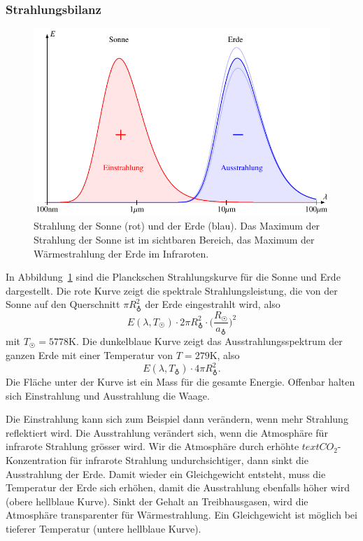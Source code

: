 \subsubsection{Strahlungsbilanz}
\begin{figure}
\centering
\includegraphics{chapters/1/vergleich.pdf}
\caption{Strahlung der Sonne (rot) und der Erde (blau).
Das Maximum der Strahlung der Sonne ist im sichtbaren Bereich,
das Maximum der Wärmestrahlung der Erde im Infraroten.
\label{skript:strahlung-sonne-erde}}
\end{figure}%
In Abbildung~\ref{skript:strahlung-sonne-erde} sind die Planckschen
Strahlungskurve für die Sonne und Erde dargestellt.
Die rote Kurve zeigt die spektrale Strahlungsleistung, die von der
Sonne auf den Querschnitt $\pi R_{\earth}^2$ der Erde eingestrahlt wird,
also
\[
E(\lambda,T_{\astrosun}) \cdot 2\pi R_{\earth}^2
\cdot
\biggl(\frac{R_{\astrosun}}{a_{\earth}}\biggr)^2
\]
mit $T_{\astrosun}=5778\text{K}$.
Die dunkelblaue Kurve zeigt das Ausstrahlungsspektrum der ganzen Erde mit
einer Temperatur von $T=279\text{K}$, also
\[
E(\lambda,T_{\earth})\cdot 4\pi R_{\earth}^2.
\]
Die Fläche unter der Kurve ist ein Mass für die gesamte Energie.
Offenbar halten sich Einstrahlung und Ausstrahlung die Waage.

Die Einstrahlung kann sich zum Beispiel dann verändern, wenn 
mehr Strahlung reflektiert wird.
Die Ausstrahlung verändert sich, wenn die Atmosphäre für infrarote
Strahlung grösser wird.
Wir die Atmosphäre durch erhöhte $text{CO}_2$-Konzentration für
infrarote Strahlung undurchsichtiger, dann sinkt die Ausstrahlung
der Erde.
Damit wieder ein Gleichgewicht entsteht, muss die Temperatur der
Erde sich erhöhen, damit die Ausstrahlung ebenfalls höher wird
(obere hellblaue Kurve).
Sinkt der Gehalt an Treibhausgasen, wird die Atmosphäre transparenter
für Wärmestrahlung.
Ein Gleichgewicht ist möglich bei tieferer Temperatur (untere
hellblaue Kurve).


